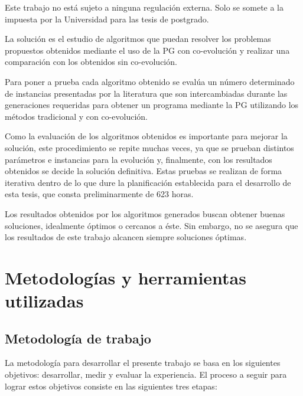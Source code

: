 Este trabajo no está sujeto a ninguna regulación externa. Solo se somete a la impuesta por la Universidad para las tesis de postgrado.

La solución es el estudio de algoritmos que puedan resolver los problemas propuestos obtenidos mediante el uso de la PG con co-evolución y realizar una comparación con los obtenidos sin co-evolución.

Para poner a prueba cada algoritmo obtenido se evalúa un número determinado de instancias presentadas por la literatura que son intercambiadas durante las generaciones requeridas para obtener un programa mediante la PG utilizando los métodos tradicional y con co-evolución.

Como la evaluación de los algoritmos obtenidos es importante para mejorar la solución, este procedimiento se repite muchas veces, ya que se prueban distintos parámetros e instancias para la evolución y, finalmente, con los resultados obtenidos se decide la solución definitiva. Estas pruebas se realizan de forma iterativa dentro de lo que dure la planificación establecida para el desarrollo de esta tesis, que consta preliminarmente de 623 horas.

Los resultados obtenidos por los algoritmos generados buscan obtener buenas soluciones, idealmente óptimos o cercanos a éste. Sin embargo, no se asegura que los resultados de este trabajo alcancen siempre soluciones óptimas.

\section{Metodologías y herramientas utilizadas}

\subsection{Metodología de trabajo}

La metodología para desarrollar el presente trabajo se basa en los siguientes objetivos: desarrollar, medir y evaluar la experiencia. El proceso a seguir para lograr estos objetivos consiste en las siguientes tres etapas:

